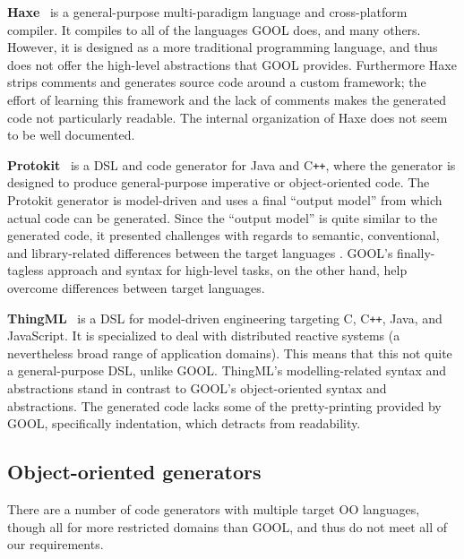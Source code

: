 \documentclass[sigplan,review,anonymous,prologue,dvipsnames]{acmart}
\newcommand{\Cplusplus}{C\texttt{++}}
\begin{document}
\textbf{Haxe}~\cite{Haxe} is a general-purpose multi-paradigm language and cross-platform
compiler.  It compiles to all of the languages GOOL does, and many
others.  However, it is designed as a more traditional programming language, and
thus does not offer the high-level abstractions that GOOL provides. Furthermore
Haxe strips comments and generates source code around a custom framework; 
the effort of learning this framework and the lack of comments makes the generated
code not particularly readable. The internal organization of Haxe does not seem
to be well documented.

\textbf{Protokit}~\cite{kovesdan2017multi} is a DSL and code generator for Java and
\Cplusplus, where the generator is designed to produce
general-purpose imperative or object-oriented code. The Protokit generator is
model-driven and uses a final ``output model'' from which actual code can be
generated. Since the ``output model'' is quite similar to the generated
code, it presented challenges with regards to semantic, conventional, and
library-related differences between the target languages
\cite{kovesdan2017multi}. GOOL's finally-tagless approach and syntax for
high-level tasks, on the other hand, help overcome differences between
target languages.

\textbf{ThingML}~\cite{harrand2016thingml} is a DSL for model-driven engineering
targeting C, \Cplusplus, Java, and JavaScript. It is specialized to deal with
distributed reactive systems (a nevertheless broad range of application domains).
This means that this not quite a general-purpose DSL, unlike GOOL.
ThingML's modelling-related syntax and abstractions stand in contrast to GOOL's
object-oriented syntax and abstractions. The generated code lacks some of the
pretty-printing provided by GOOL, specifically indentation, which detracts from
readability.

\subsection{Object-oriented generators}

There are a number of code generators with multiple target OO languages,
though all for more restricted domains than GOOL, and thus do not meet all
of our requirements.
\end{document}
